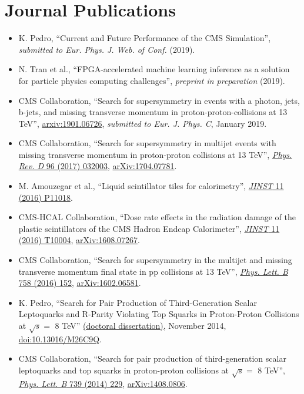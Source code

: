 \section{Journal Publications}
\begin{itemize}[leftmargin=12pt]
\ifdefined\longerflag
\item K. Pedro, ``Current and Future Performance of the CMS Simulation'', \emph{submitted to Eur. Phys. J. Web. of Conf.} (2019).
\item N. Tran et al., ``FPGA-accelerated machine learning inference as a solution for particle physics computing challenges'', \emph{preprint in preparation} (2019).
\fi
\item CMS Collaboration, ``Search for supersymmetry in events with a photon, jets, b-jets, and missing transverse momentum in proton-proton-collisions at 13 TeV'', \href{https://arxiv.org/abs/1901.06726}{arxiv:1901.06726}, \emph{submitted to Eur. J. Phys. C}, January 2019.
\item CMS Collaboration, ``Search for supersymmetry in multijet events with missing transverse momentum in proton-proton collisions at 13 TeV'', \href{http://dx.doi.org/10.1103/PhysRevD.96.032003}{\emph{Phys. Rev. D} 96 (2017) 032003}, \href{http://arxiv.org/abs/1704.07781}{arXiv:1704.07781}.
\item M. Amouzegar et al., ``Liquid scintillator tiles for calorimetry'', \href{http://dx.doi.org/10.1088/1748-0221/11/11/P11018}{\emph{JINST} 11 (2016) P11018}.
\item CMS-HCAL Collaboration, ``Dose rate effects in the radiation damage of the plastic scintillators of the CMS Hadron Endcap Calorimeter'', \href{http://dx.doi.org/10.1088/1748-0221/11/10/T10004}{\emph{JINST} 11 (2016) T10004}, \href{http://arxiv.org/abs/1608.07267}{arXiv:1608.07267}.
\item CMS Collaboration, ``Search for supersymmetry in the multijet and missing transverse momentum final state in pp collisions at 13 TeV'', \href{http://dx.doi.org/10.1016/j.physletb.2016.05.002}{\emph{Phys. Lett. B} 758 (2016) 152}, \href{http://arxiv.org/abs/1602.06581}{arXiv:1602.06581}.
\ifdefined\longflag
\item K. Pedro, ``Search for Pair Production of Third-Generation Scalar Leptoquarks and R-Parity Violating Top Squarks in Proton-Proton Collisions at $\sqrt{s} =$ 8 TeV'' \href{http://cds.cern.ch/record/1968611}{(doctoral dissertation)}, November 2014, \href{https://doi.org/10.13016/M26C9Q}{doi:10.13016/M26C9Q}.
\fi
\item CMS Collaboration, ``Search for pair production of third-generation scalar leptoquarks and top squarks in proton-proton collisions at $\sqrt{s} =$ 8 TeV'', \href{http://dx.doi.org/10.1016/j.physletb.2014.10.063}{\emph{Phys. Lett. B} 739 (2014) 229}, \href{http://arxiv.org/abs/1408.0806}{arXiv:1408.0806}.

\end{itemize}
